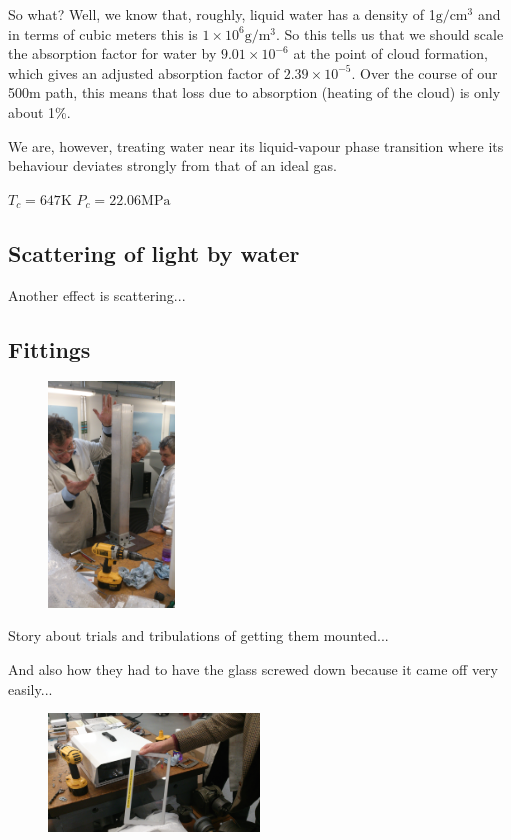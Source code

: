 So what? Well, we know that, roughly, liquid water has a density of
1$\text{g}/\text{cm}^3$ and in terms of cubic meters this is $1\times
10^6\text{g}/\text{m}^3$. So this tells us that we should scale the
absorption factor for water by $9.01\times 10^{-6}$ at the point of
cloud formation, which gives an adjusted absorption factor of
$2.39\times 10^{-5}$. Over the course of our 500m path, this means
that loss due to absorption (heating of the cloud) is only about
1\%.

We are, however, treating water near its liquid-vapour phase
transition where its behaviour deviates strongly from that of an ideal
gas. 

$T_c = 647\text{K}$
$P_c = 22.06\text{MPa}$

\subsection{Scattering of light by water}
\label{sec:scattering}
Another effect is scattering...

\clearpage
\subsection{Fittings}
\label{sec:fittings}

\begin{figure}
  \includegraphics[angle=-90,width=0.3\textwidth]{tada}
\end{figure}
Story about trials and tribulations of getting them mounted...

And also how they had to have the glass screwed down because it came
off very easily...

\begin{figure}[h]
  \begin{center}
    \includegraphics[width=0.5\textwidth]{faulty}
  \end{center}
\end{figure}

